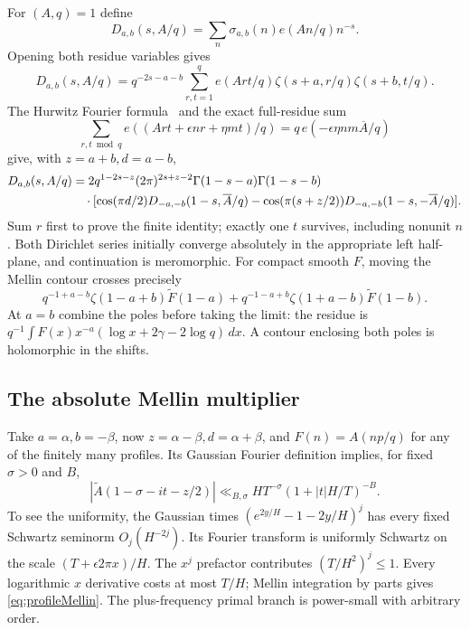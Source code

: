 \documentclass[11pt]{article}
\theoremstyle{remark}
\begin{document}
For $(A,q)=1$ define
\[
 D_{a,b}(s,A/q)=\sum_n\sigma_{a,b}(n)e(An/q)n^{-s}.
\]
Opening both residue variables gives
\[
 D_{a,b}(s,A/q)=q^{-2s-a-b}
 \sum_{r,t=1}^q e(Art/q)\zeta(s+a,r/q)\zeta(s+b,t/q).
\]
The Hurwitz Fourier formula~\cite{DLMF} and the exact full-residue sum
\[
 \sum_{r,t\bmod q}e((Art+\epsilon nr+\eta mt)/q)
       =q\,e(-\epsilon\eta nm\overline A/q)
\]
give, with $z=a+b,d=a-b$,
\begin{align}\label{eq:Estermann}
 D_{a,b}(s,A/q)&=2q^{1-2s-z}(2\pi)^{2s+z-2}
 \Gamma(1-s-a)\Gamma(1-s-b)\notag\\
 &\quad\cdot[\cos(\pi d/2)D_{-a,-b}(1-s,\overline A/q)
 -\cos(\pi(s+z/2))D_{-a,-b}(1-s,-\overline A/q)].
\end{align}
Sum $r$ first to prove the finite identity; exactly one $t$ survives,
including nonunit $n$. Both Dirichlet series initially converge absolutely
in the appropriate left half-plane, and continuation is meromorphic.
For compact smooth $F$, moving the Mellin contour crosses precisely
\[
 q^{-1+a-b}\zeta(1-a+b)\widetilde F(1-a)
 +q^{-1-a+b}\zeta(1+a-b)\widetilde F(1-b).
\]
At $a=b$ combine the poles before taking the limit: the residue is
$q^{-1}\int F(x)x^{-a}(\log x+2\gamma-2\log q)\,dx$.
A contour enclosing both poles is holomorphic in the shifts.

\subsection{The absolute Mellin multiplier}
Take $a=\alpha,b=-\beta$, now $z=\alpha-\beta,d=\alpha+\beta$,
and $F(n)=A(np/q)$ for any of the finitely many profiles.
Its Gaussian Fourier definition implies, for fixed $\sigma>0$ and $B$,
\begin{equation}\label{eq:profileMellin}
 |\widetilde A(1-\sigma-it-z/2)|
 \ll_{B,\sigma} H T^{-\sigma}(1+|t|H/T)^{-B}.
\end{equation}
To see the uniformity, the Gaussian times
$(e^{2y/H}-1-2y/H)^j$ has every fixed Schwartz seminorm
$O_j(H^{-2j})$. Its Fourier transform is uniformly Schwartz on the
scale $(T+\epsilon2\pi x)/H$. The $x^j$ prefactor contributes
$(T/H^2)^j\le1$. Every logarithmic $x$ derivative costs at most $T/H$;
Mellin integration by parts gives \eqref{eq:profileMellin}.
The plus-frequency primal branch is power-small with arbitrary order.
\end{document}

